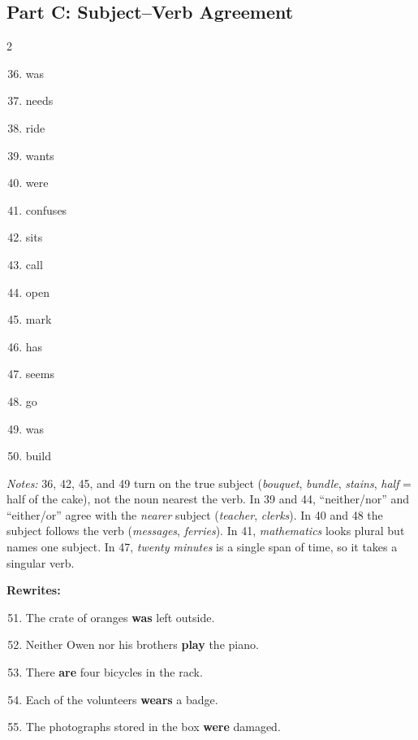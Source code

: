 \documentclass[11pt]{article}
\begin{document}
\subsection*{Part C: Subject--Verb Agreement}
\begin{multicols}{2}
\begin{enumerate}\setcounter{enumi}{35}
  \item was
  \item needs
  \item ride
  \item wants
  \item were
  \item confuses
  \item sits
  \item call
  \item open
  \item mark
  \item has
  \item seems
  \item go
  \item was
  \item build
\end{enumerate}
\end{multicols}
\noindent\textit{Notes:} 36, 42, 45, and 49 turn on the true subject (\textit{bouquet}, \textit{bundle}, \textit{stains}, \textit{half} = half of the cake), not the noun nearest the verb. In 39 and 44, ``neither/nor'' and ``either/or'' agree with the \textit{nearer} subject (\textit{teacher}, \textit{clerks}). In 40 and 48 the subject follows the verb (\textit{messages}, \textit{ferries}). In 41, \textit{mathematics} looks plural but names one subject. In 47, \textit{twenty minutes} is a single span of time, so it takes a singular verb.

\vspace{4pt}
\noindent\textbf{Rewrites:}
\begin{enumerate}\setcounter{enumi}{50}
  \item The crate of oranges \textbf{was} left outside.
  \item Neither Owen nor his brothers \textbf{play} the piano.
  \item There \textbf{are} four bicycles in the rack.
  \item Each of the volunteers \textbf{wears} a badge.
  \item The photographs stored in the box \textbf{were} damaged.
\end{enumerate}
\end{document}
